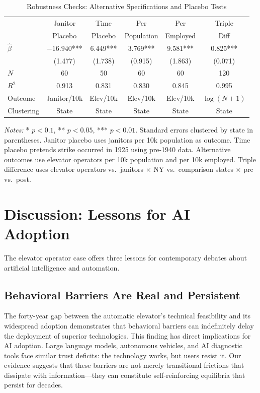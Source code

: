 \documentclass[12pt]{article}
\begin{document}
\begin{table}[H]
\centering
\caption{Robustness Checks: Alternative Specifications and Placebo Tests}
\label{tab:robustness}
\small
\begin{tabular}{lccccc}
\toprule
 & Janitor & Time & Per & Per & Triple \\
 & Placebo & Placebo & Population & Employed & Diff \\
\midrule
$\hat{\beta}$ & $-16.940$*** & 6.449*** & 3.769*** & 9.581*** & 0.825*** \\
 & (1.477) & (1.738) & (0.915) & (1.863) & (0.071) \\
\addlinespace
$N$ & 60 & 50 & 60 & 60 & 120 \\
$R^2$ & 0.913 & 0.831 & 0.830 & 0.845 & 0.995 \\
\midrule
Outcome & Janitor/10k & Elev/10k & Elev/10k & Elev/10k & $\log(N+1)$ \\
Clustering & State & State & State & State & State \\
\bottomrule
\end{tabular}
\begin{flushleft}
\small\textit{Notes:} * $p<0.1$, ** $p<0.05$, *** $p<0.01$. Standard errors clustered by state in parentheses. Janitor placebo uses janitors per 10k population as outcome. Time placebo pretends strike occurred in 1925 using pre-1940 data. Alternative outcomes use elevator operators per 10k population and per 10k employed. Triple difference uses elevator operators vs.\ janitors $\times$ NY vs.\ comparison states $\times$ pre vs.\ post.
\end{flushleft}
\end{table}


\section{Discussion: Lessons for AI Adoption}

The elevator operator case offers three lessons for contemporary debates about artificial intelligence and automation.

\subsection{Behavioral Barriers Are Real and Persistent}

The forty-year gap between the automatic elevator's technical feasibility and its widespread adoption demonstrates that behavioral barriers can indefinitely delay the deployment of superior technologies. This finding has direct implications for AI adoption. Large language models, autonomous vehicles, and AI diagnostic tools face similar trust deficits: the technology works, but users resist it. Our evidence suggests that these barriers are not merely transitional frictions that dissipate with information---they can constitute self-reinforcing equilibria that persist for decades.
\end{document}

